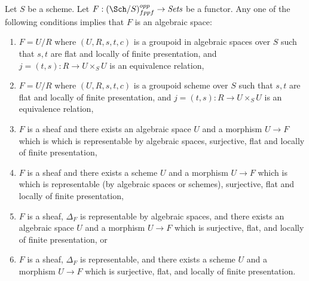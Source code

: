 \begin{theorem}
\label{theorem-final-bootstrap}
Let $S$ be a scheme.
Let $F : (\Sch/S)_{fppf}^{opp} \to \textit{Sets}$ be a functor.
Any one of the following conditions implies that $F$ is an algebraic space:
\begin{enumerate}
\item $F = U/R$ where $(U, R, s, t, c)$ is a groupoid in algebraic spaces
over $S$ such that $s, t$ are flat and locally of finite presentation, and
$j = (t, s) : R \to U \times_S U$ is an equivalence relation,
\item $F = U/R$ where $(U, R, s, t, c)$ is a groupoid scheme
over $S$ such that $s, t$ are flat and locally of finite presentation, and
$j = (t, s) : R \to U \times_S U$ is an equivalence relation,
\item $F$ is a sheaf and there exists an algebraic space $U$ and a morphism
$U \to F$ which is which is representable by algebraic spaces,
surjective, flat and locally of finite presentation,
\item $F$ is a sheaf and there exists a scheme $U$ and a morphism
$U \to F$ which is which is representable (by algebraic spaces or schemes),
surjective, flat and locally of finite presentation,
\item $F$ is a sheaf, $\Delta_F$ is representable by algebraic spaces,
and there exists an algebraic space $U$ and a morphism $U \to F$ which is
surjective, flat, and locally of finite presentation, or
\item $F$ is a sheaf, $\Delta_F$ is representable,
and there exists a scheme $U$ and a morphism $U \to F$ which is
surjective, flat, and locally of finite presentation.
\end{enumerate}
\end{theorem}

